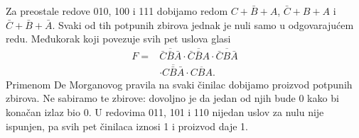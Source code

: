 
Za preostale redove 010, 100 i 111 dobijamo redom \(C+\bar B+A\), \(\bar C+B+A\) i \(\bar C+\bar B+\bar A\). Svaki od tih potpunih zbirova jednak je nuli samo u odgovarajućem redu. Međukorak koji povezuje svih pet uslova glasi
\[
\begin{aligned}
F={}&\overline{\bar C\bar B\bar A}\cdot\overline{\bar C\bar BA}\cdot\overline{\bar CB\bar A}\\
 &\cdot\overline{C\bar B\bar A}\cdot\overline{CBA}.
\end{aligned}
\]
Primenom De Morganovog pravila na svaki činilac dobijamo proizvod potpunih zbirova. Ne sabiramo te zbirove: dovoljno je da jedan od njih bude 0 kako bi konačan izlaz bio 0. U redovima 011, 101 i 110 nijedan uslov za nulu nije ispunjen, pa svih pet činilaca iznosi 1 i proizvod daje 1.
